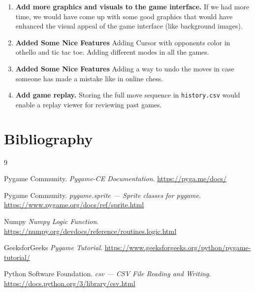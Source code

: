 \documentclass[12pt]{article}
\begin{document}
\begin{enumerate}
  
    \item \textbf{Add more graphics and visuals to the game interface.} If we had more time, we would have come up with some good graphics that would have enhanced the visual appeal of the game interface (like background images).
 
    \item \textbf{Added Some Nice Features}
    Adding Cursor with opponents color in othello and tic tac toe. Adding
    different modes in all the games.
 
    \item \textbf{Added Some Nice Features}
    Adding a way to undo the moves in case someone has made a mistake like in online chess.
 
    \item \textbf{Add game replay.} Storing the full move sequence in \texttt{history.csv} would enable a replay viewer for reviewing past games.
\end{enumerate}
 

\section{Bibliography}
 
\begin{thebibliography}{9}
 
Pygame Community.
\textit{Pygame-CE Documentation}.
\url{https://pyga.me/docs/}
 
Pygame Community.
\textit{pygame.sprite --- Sprite classes for pygame}.
\url{https://www.pygame.org/docs/ref/sprite.html}
 
Numpy
\textit{Numpy Logic Function}.
\url{https://numpy.org/devdocs/reference/routines.logic.html}
 
 
GeeksforGeeks
\textit{Pygame Tutorial}.
\url{https://www.geeksforgeeks.org/python/pygame-tutorial/}
 
Python Software Foundation.
\textit{csv --- CSV File Reading and Writing}.
\url{https://docs.python.org/3/library/csv.html}
 
 
\end{thebibliography}
 
\end{document}
